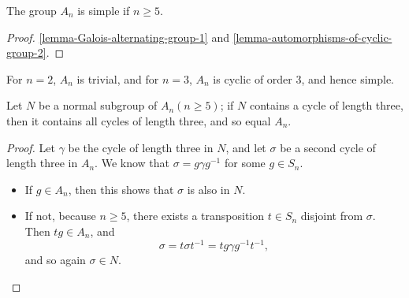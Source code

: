 \begin{theorem}[Galois]
  \label{theorem-Galois-alternating-group}
  The group \( A_n \) is simple if \( n \geq 5 \).
\end{theorem}
\begin{proof}
  \ref{lemma-Galois-alternating-group-1} and \ref{lemma-automorphisms-of-cyclic-group-2}.
\end{proof}

\begin{remark}
  \label{remark-alternating-group-with-order-2-and-3}
  For \( n = 2 \), \( A_n \) is trivial, and for \( n = 3 \), \( A_n \) is cyclic of order \( 3 \), and hence simple.
\end{remark}

\begin{lemma}
  \label{lemma-Galois-alternating-group-1}
  Let \( N \) be a normal subgroup of \( A_n(n \geq 5) \);
  if \( N \) contains a cycle of length three, then it contains all cycles of length three, and so equal \( A_n \).
\end{lemma}
\begin{proof}
  Let \( \gamma \) be the cycle of length three in \( N \), and let \( \sigma \) be a second cycle of length three in \( A_n \).
  We know that \( \sigma = g \gamma g^{-1} \) for some \( g \in S_n \).
  \begin{itemize}
    \item If \( g \in A_n \), then this shows that \( \sigma \) is also in \( N \).
    \item If not, because \( n \geq 5 \), there exists a transposition \( t \in S_n \) disjoint from \( \sigma \).
      Then \( tg \in A_n \), and
      \[
        \sigma = t \sigma t^{-1} = tg \gamma g^{-1} t^{-1},
      \]
      and so again \( \sigma \in N \).
  \end{itemize}
\end{proof}

